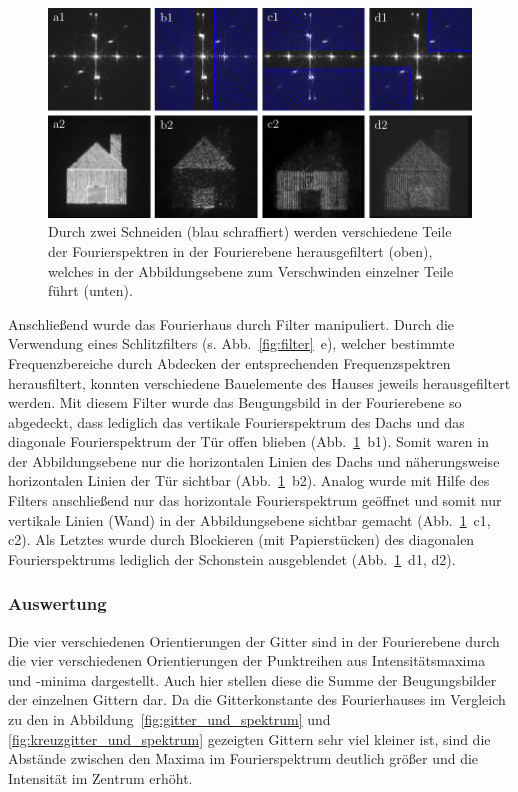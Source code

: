 \begin{figure}[h]
	\centering
	\includegraphics[scale=1]{images/Regina/abb21.pdf}
	
	\caption[Fourierhaus mit verschiedenen Filtern]{
		Durch zwei Schneiden (blau schraffiert) werden verschiedene Teile der Fourierspektren in der Fourierebene herausgefiltert (oben), welches in der Abbildungsebene zum Verschwinden einzelner Teile führt (unten).
	}
	\label{fig:fourierhaus_mit_filtern}
\end{figure}

Anschließend wurde das Fourierhaus durch Filter manipuliert. Durch die Verwendung eines Schlitzfilters (s. Abb.~\ref{fig:filter}~e), welcher bestimmte Frequenzbereiche durch Abdecken der entsprechenden Frequenzspektren herausfiltert, konnten verschiedene Bauelemente des Hauses jeweils herausgefiltert werden. Mit diesem Filter wurde das Beugungsbild in der Fourierebene so abgedeckt, dass lediglich das vertikale Fourierspektrum des Dachs und das diagonale Fourierspektrum der Tür offen blieben (Abb.~\ref{fig:fourierhaus_mit_filtern}~b1). Somit waren in der Abbildungsebene nur die horizontalen Linien des Dachs und näherungsweise horizontalen Linien der Tür sichtbar (Abb.~\ref{fig:fourierhaus_mit_filtern}~b2). Analog wurde mit Hilfe des Filters anschließend nur das horizontale Fourierspektrum geöffnet und somit nur vertikale Linien (Wand) in der Abbildungsebene sichtbar gemacht (Abb.~\ref{fig:fourierhaus_mit_filtern}~c1, c2). Als Letztes wurde durch Blockieren (mit Papierstücken) des diagonalen Fourierspektrums lediglich der Schonstein ausgeblendet (Abb.~\ref{fig:fourierhaus_mit_filtern}~d1, d2).

\subsubsection*{Auswertung}
Die vier verschiedenen Orientierungen der Gitter sind in der Fourierebene durch die vier verschiedenen Orientierungen der Punktreihen aus Intensitätsmaxima und -minima dargestellt. Auch hier stellen diese die Summe der Beugungsbilder der einzelnen Gittern dar. Da die Gitterkonstante des Fourierhauses im Vergleich zu den in Abbildung~\ref{fig:gitter_und_spektrum} und \ref{fig:kreuzgitter_und_spektrum} gezeigten Gittern sehr viel kleiner ist, sind die Abstände zwischen den Maxima im Fourierspektrum deutlich größer und die Intensität im Zentrum erhöht.


